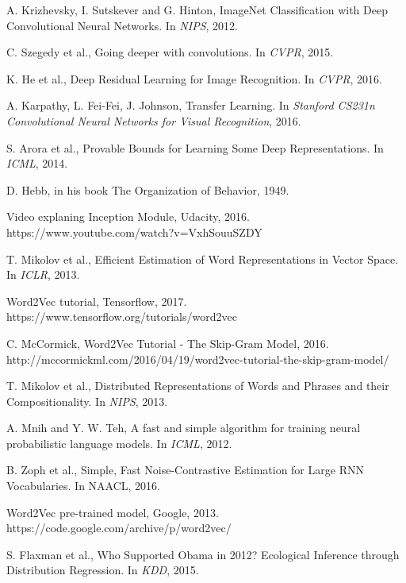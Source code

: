\begin{thebibliography}{999}
A. Krizhevsky, I. Sutskever and G. Hinton, ImageNet Classification with Deep Convolutional
Neural Networks. In \textit{NIPS}, 2012.

C. Szegedy et al., Going deeper with convolutions. In \textit{CVPR}, 2015.

K. He et al., Deep Residual Learning for Image Recognition. In \textit{CVPR}, 2016.

A. Karpathy, L. Fei-Fei, J. Johnson, Transfer Learning. In \textit{Stanford CS231n Convolutional Neural Networks for Visual Recognition}, 2016.

S. Arora et al., Provable Bounds for Learning Some Deep Representations. In \textit{ICML}, 2014. 

D. Hebb, in his book The Organization of Behavior, 1949.

Video explaning Inception Module, Udacity, 2016. \\ https://www.youtube.com/watch?v=VxhSouuSZDY

T. Mikolov et al., Efficient Estimation of Word Representations in Vector Space. In \textit{ICLR}, 2013.

Word2Vec tutorial, Tensorflow, 2017. \\
https://www.tensorflow.org/tutorials/word2vec

C. McCormick, Word2Vec Tutorial - The Skip-Gram Model, 2016. \\http://mccormickml.com/2016/04/19/word2vec-tutorial-the-skip-gram-model/

T. Mikolov et al., Distributed Representations of Words and Phrases and their Compositionality. In \textit{NIPS}, 2013.

A. Mnih and Y. W. Teh, A fast and simple algorithm for training neural probabilistic language models. In \textit{ICML}, 2012.

B. Zoph et al., Simple, Fast Noise-Contrastive Estimation for Large RNN Vocabularies. In {NAACL}, 2016.

Word2Vec pre-trained model, Google, 2013. \\https://code.google.com/archive/p/word2vec/

S. Flaxman et al., Who Supported Obama in 2012? Ecological Inference through Distribution Regression. In \textit{KDD}, 2015.


\end{thebibliography}
